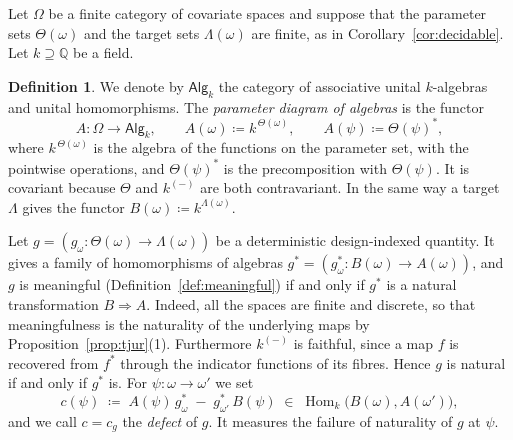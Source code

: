 \documentclass[11pt,a4paper]{article}
\theoremstyle{plain}
\theoremstyle{definition}
\newtheorem{definition}[theorem]{Definition}
\theoremstyle{remark}
\newcommand{\cat}[1]{\mathsf{#1}}
\newcommand{\catO}{\cat{\Omega}}
\newcommand{\Alg}{\cat{Alg}}
\DeclareMathOperator{\Hom}{Hom}
\begin{document}
Let $\catO$ be a finite category of covariate spaces and suppose that the
parameter sets $\Theta(\omega)$ and the target sets $\Lambda(\omega)$ are
finite, as in Corollary~\ref{cor:decidable}. Let $k \supseteq \mathbb{Q}$ be a
field.

\begin{definition}\label{def:diagalg}
We denote by $\Alg_k$ the category of associative unital $k$-algebras and
unital homomorphisms. The \emph{parameter diagram of algebras} is the functor
\[
A \colon \catO \longrightarrow \Alg_k,
\qquad
A(\omega) \coloneqq k^{\,\Theta(\omega)},
\qquad
A(\psi) \coloneqq \Theta(\psi)^{*},
\]
where $k^{\,\Theta(\omega)}$ is the algebra of the functions on the parameter
set, with the pointwise operations, and $\Theta(\psi)^{*}$ is the
precomposition with $\Theta(\psi)$. It is covariant because $\Theta$ and
$k^{(-)}$ are both contravariant. In the same way a target $\Lambda$ gives the
functor $B(\omega) \coloneqq k^{\Lambda(\omega)}$.
\end{definition}

Let $g = (g_\omega \colon \Theta(\omega) \to \Lambda(\omega))$ be a
deterministic design-indexed quantity. It gives a family of homomorphisms of
algebras $g^{*} = (g_\omega^{*} \colon B(\omega) \to A(\omega))$, and $g$ is
meaningful (Definition~\ref{def:meaningful}) if and only if $g^{*}$ is a
natural transformation $B \Rightarrow A$. Indeed, all the spaces are finite and
discrete, so that meaningfulness is the naturality of the underlying maps by
Proposition~\ref{prop:tjur}(1). Furthermore $k^{(-)}$ is faithful, since a map
$f$ is recovered from $f^{*}$ through the indicator functions of its fibres.
Hence $g$ is natural if and only if $g^{*}$ is. For
$\psi \colon \omega \to \omega'$ we set
\begin{equation}\label{eq:defect}
c(\psi) \;\coloneqq\; A(\psi)\, g_{\omega}^{*} \;-\; g_{\omega'}^{*}\, B(\psi)
\;\in\; \Hom_k\bigl(B(\omega), A(\omega')\bigr),
\end{equation}
and we call $c = c_g$ the \emph{defect} of $g$. It measures the failure of
naturality of $g$ at $\psi$.
\end{document}
